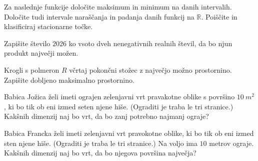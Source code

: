 \documentclass[11pt,a4paper]{exam}
\renewcommand{\{}{\lbrace}
\renewcommand{\}}{\rbrace}
\begin{document}
\begin{questions}
	\question Za naslednje funkcije določite maksimum in minimum na danih intervalih. Določite tudi intervale naraščanja in padanja danih funkcij na $\mathbb{R}$. Poiščite in klasificiraj stacionarne točke.

	\question Zapišite število $2026$ ko vsoto dveh nenegativnih realnih števil, da bo njun produkt največji možen.

	\question
 	Krogli s polmeron $R$ včrtaj pokončni stožec z največjo možno prostornino. Zapišite dobljeno maksimalno prostornino.

	\question
	Babica Jožica želi imeti ograjen zelenjavni vrt pravakotne oblike s površino $10 \ m^2$, ki bo tik ob eni izmed seten njene hiše. (Ograditi je traba le tri stranice.) Kakšnih dimenzij naj bo vrt, da bo zanj potrebno najmanj ograje?

	\question
	Babica Francka želi imeti zelenjavni vrt pravokotne oblike, ki bo tik ob eni izmed sten njene hiše. (Ograditi je traba le tri stranice.) Na voljo ima $10$ metrov ograje. Kakšnih dimenzij naj bo vrt, da bo njegova površina največja?

\end{questions}
\clearpage
\end{document}
